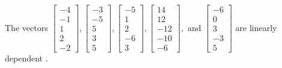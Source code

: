 \begin{exercise}
\begin{exerciseStatement}
  \end{exerciseStatement}
  \begin{exerciseAnswer}
   The vectors \(\left[\begin{array}{r}
-4 \\
-1 \\
1 \\
2 \\
-2
\end{array}\right] , \left[\begin{array}{r}
-3 \\
-5 \\
5 \\
3 \\
5
\end{array}\right] , \left[\begin{array}{r}
-5 \\
1 \\
2 \\
-6 \\
3
\end{array}\right] , \left[\begin{array}{r}
14 \\
12 \\
-12 \\
-10 \\
-6
\end{array}\right] , \text{ and } \left[\begin{array}{r}
-6 \\
0 \\
3 \\
-3 \\
5
\end{array}\right]\) are 
  	 linearly dependent  .
  


  \end{exerciseAnswer}
\end{exercise}